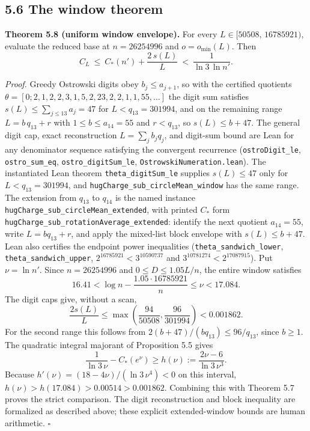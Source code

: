 \documentclass[12pt]{article}
\begin{document}
\subsection{5.6 The window theorem}\label{the-window-theorem}

\textbf{Theorem 5.8 (uniform window envelope).} For every
\(L\in[50508,\,16785921)\), evaluate the reduced base at \(n=26254996\)
and \(o=o_{\min}(L)\). Then \[
C_L\ \le\ C_*(n')+\frac{2\,s(L)}{L}\ <\ \frac1{\ln 3\,\ln n'}.
\]

\emph{Proof.} Greedy Ostrowski digits obey \(b_j\le a_{j+1}\), so with
the certified quotients
\(\theta=[0;2,1,2,2,3,1,5,2,23,2,2,1,1,55,\ldots]\) the digit sum
satisfies \(s(L)\le\sum_{j\le13}a_j=47\) for \(L<q_{13}=301994\), and on
the remaining range \(L=b\,q_{13}+r\) with \(1\le b\le a_{14}=55\) and
\(r<q_{13}\), so \(s(L)\le b+47\). The general digit cap, exact
reconstruction \(L=\sum_j b_jq_j\), and digit-sum bound are Lean for any
denominator sequence satisfying the convergent recurrence
(\texttt{\nolinkurl{ostroDigit_le}}, \texttt{\nolinkurl{ostro_sum_eq}},
\texttt{\nolinkurl{ostro_digitSum_le}},
\texttt{\nolinkurl{OstrowskiNumeration.lean}}). The instantiated Lean
theorem \texttt{\nolinkurl{theta_digitSum_le}} supplies \(s(L)\le47\)
only for \(L<q_{13}=301994\), and
\texttt{\nolinkurl{hugCharge_sub_circleMean_window}} has the same range.
The extension from \(q_{13}\) to \(q_{14}\) is the named instance
\texttt{\nolinkurl{hugCharge_sub_circleMean_extended}}, with printed
\(C_*\) form
\texttt{\nolinkurl{hugCharge_sub_rotationAverage_extended}}: identify
the next quotient \(a_{14}=55\), write \(L=bq_{13}+r\), and apply the
mixed-list block envelope with \(s(L)\le b+47\). Lean also certifies the
endpoint power inequalities (\texttt{\nolinkurl{theta_sandwich_lower}},
\texttt{\nolinkurl{theta_sandwich_upper}}, \(2^{16785921}<3^{10590737}\)
and \(3^{10781274}<2^{17087915}\)). Put \(\nu=\ln n'\). Since
\(n=26254996\) and \(0\le D\le1.05L/n\), the entire window satisfies \[
16.41<\log n-\frac{1.05\cdot16785921}{n}\le\nu<17.084.
\] The digit caps give, without a scan, \[
\frac{2s(L)}{L}\le
\max\!\left(\frac{94}{50508},\frac{96}{301994}\right)
<0.001862.
\] For the second range this follows from
\(2(b+47)/(bq_{13})\le96/q_{13}\), since \(b\ge1\). The quadratic
integral majorant of Proposition 5.5 gives \[
\frac1{\ln3\,\nu}-C_*(e^\nu)
\ge h(\nu):=\frac{2\nu-6}{\ln3\,\nu^3}.
\] Because \(h'(\nu)=(18-4\nu)/(\ln3\,\nu^4)<0\) on this interval,
\(h(\nu)>h(17.084)>0.00514>0.001862\). Combining this with Theorem 5.7
proves the strict comparison. The digit reconstruction and block
inequality are formalized as described above; these explicit
extended-window bounds are human arithmetic. \(\square\)
\end{document}
